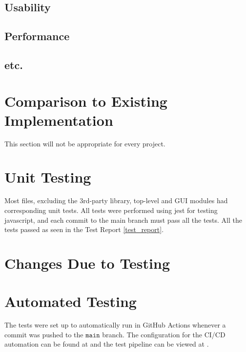 \documentclass[12pt, titlepage]{article}
\begin{document}
\subsection{Usability}
		
\subsection{Performance}

\subsection{etc.}
	
\section{Comparison to Existing Implementation}	

This section will not be appropriate for every project.

\section{Unit Testing}

Most files, excluding the 3rd-party library, top-level and GUI modules had corresponding unit tests.
All tests were performed using jest for testing javascript, and each commit to the main branch must pass all the tests.
All the tests passed as seen in the Test Report \ref{test_report}.

\section{Changes Due to Testing}


\section{Automated Testing}

The tests were set up to automatically run in GitHub Actions whenever a commit was pushed to the $\mathtt{main}$ branch.
The configuration for the CI/CD automation can be found at \url{}
and the test pipeline can be viewed at \url{}.
		
\end{document}

